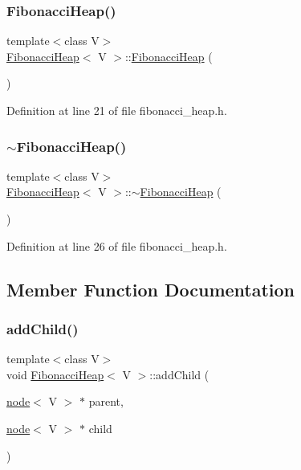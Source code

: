 \subsubsection{\texorpdfstring{Fibonacci\+Heap()}{FibonacciHeap()}}
{\footnotesize\ttfamily template$<$class V$>$ \\
\hyperlink{class_fibonacci_heap}{Fibonacci\+Heap}$<$ V $>$\+::\hyperlink{class_fibonacci_heap}{Fibonacci\+Heap} (\begin{DoxyParamCaption}{ }\end{DoxyParamCaption})\hspace{0.3cm}{\ttfamily [inline]}}



Definition at line 21 of file fibonacci\+\_\+heap.\+h.

\mbox{\label{class_fibonacci_heap_a106b353a0c16a47d28916cac8b2370a0}} 
\subsubsection{\texorpdfstring{$\sim$\+Fibonacci\+Heap()}{~FibonacciHeap()}}
{\footnotesize\ttfamily template$<$class V$>$ \\
\hyperlink{class_fibonacci_heap}{Fibonacci\+Heap}$<$ V $>$\+::$\sim$\hyperlink{class_fibonacci_heap}{Fibonacci\+Heap} (\begin{DoxyParamCaption}{ }\end{DoxyParamCaption})\hspace{0.3cm}{\ttfamily [inline]}}



Definition at line 26 of file fibonacci\+\_\+heap.\+h.



\subsection{Member Function Documentation}
\mbox{\label{class_fibonacci_heap_aa9ad54a64b54264ec3dd435a4190af16}} 
\subsubsection{\texorpdfstring{add\+Child()}{addChild()}}
{\footnotesize\ttfamily template$<$class V$>$ \\
void \hyperlink{class_fibonacci_heap}{Fibonacci\+Heap}$<$ V $>$\+::add\+Child (\begin{DoxyParamCaption}\item[{\hyperlink{structnode}{node}$<$ V $>$ $\ast$}]{parent,  }\item[{\hyperlink{structnode}{node}$<$ V $>$ $\ast$}]{child }\end{DoxyParamCaption})\hspace{0.3cm}{\ttfamily [inline]}}



